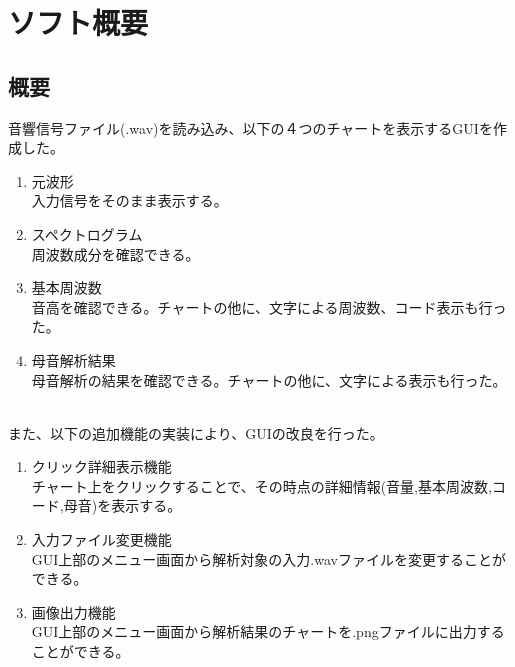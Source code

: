 \documentclass[a4j]{jarticle}
\begin{document}
\section{ソフト概要}
\subsection{概要}
音響信号ファイル(.wav)を読み込み、以下の４つのチャートを表示するGUIを作成した。\\

\begin{enumerate}
\item 元波形　~\\
入力信号をそのまま表示する。
\item スペクトログラム　~\\
周波数成分を確認できる。
\item 基本周波数　~\\
音高を確認できる。チャートの他に、文字による周波数、コード表示も行った。
\item 母音解析結果　~\\
母音解析の結果を確認できる。チャートの他に、文字による表示も行った。
\end{enumerate}
　\\
また、以下の追加機能の実装により、GUIの改良を行った。\\

\begin{enumerate}
\item クリック詳細表示機能　~\\
チャート上をクリックすることで、その時点の詳細情報(音量,基本周波数,コード,母音)を表示する。
\item 入力ファイル変更機能　~\\
GUI上部のメニュー画面から解析対象の入力.wavファイルを変更することができる。
\item 画像出力機能　~\\
GUI上部のメニュー画面から解析結果のチャートを.pngファイルに出力することができる。
\end{enumerate}
\end{document}

